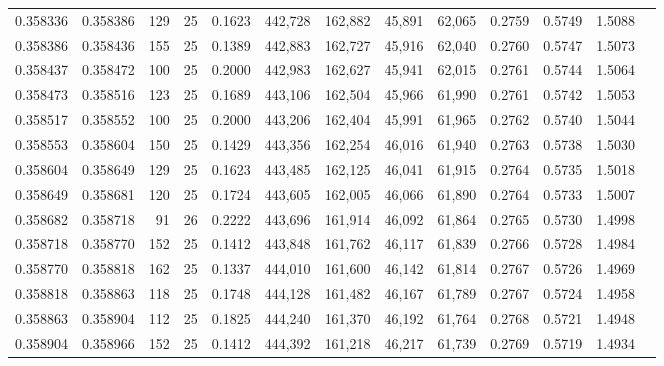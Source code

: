 \begin{tabular}{rrrrrrrrrrrrr}
0.358336 & 0.358386 &   129 &  25 &                                     0.1623 & 442,728 & 162,882 &  45,891 &  62,065 & 0.2759 & 0.5749 & 1.5088 \\
0.358386 & 0.358436 &   155 &  25 &                                     0.1389 & 442,883 & 162,727 &  45,916 &  62,040 & 0.2760 & 0.5747 & 1.5073 \\
0.358437 & 0.358472 &   100 &  25 &                                     0.2000 & 442,983 & 162,627 &  45,941 &  62,015 & 0.2761 & 0.5744 & 1.5064 \\
0.358473 & 0.358516 &   123 &  25 &                                     0.1689 & 443,106 & 162,504 &  45,966 &  61,990 & 0.2761 & 0.5742 & 1.5053 \\
0.358517 & 0.358552 &   100 &  25 &                                     0.2000 & 443,206 & 162,404 &  45,991 &  61,965 & 0.2762 & 0.5740 & 1.5044 \\
0.358553 & 0.358604 &   150 &  25 &                                     0.1429 & 443,356 & 162,254 &  46,016 &  61,940 & 0.2763 & 0.5738 & 1.5030 \\
0.358604 & 0.358649 &   129 &  25 &                                     0.1623 & 443,485 & 162,125 &  46,041 &  61,915 & 0.2764 & 0.5735 & 1.5018 \\
0.358649 & 0.358681 &   120 &  25 &                                     0.1724 & 443,605 & 162,005 &  46,066 &  61,890 & 0.2764 & 0.5733 & 1.5007 \\
0.358682 & 0.358718 &    91 &  26 &                                     0.2222 & 443,696 & 161,914 &  46,092 &  61,864 & 0.2765 & 0.5730 & 1.4998 \\
0.358718 & 0.358770 &   152 &  25 &                                     0.1412 & 443,848 & 161,762 &  46,117 &  61,839 & 0.2766 & 0.5728 & 1.4984 \\
0.358770 & 0.358818 &   162 &  25 &                                     0.1337 & 444,010 & 161,600 &  46,142 &  61,814 & 0.2767 & 0.5726 & 1.4969 \\
0.358818 & 0.358863 &   118 &  25 &                                     0.1748 & 444,128 & 161,482 &  46,167 &  61,789 & 0.2767 & 0.5724 & 1.4958 \\
0.358863 & 0.358904 &   112 &  25 &                                     0.1825 & 444,240 & 161,370 &  46,192 &  61,764 & 0.2768 & 0.5721 & 1.4948 \\
0.358904 & 0.358966 &   152 &  25 &                                     0.1412 & 444,392 & 161,218 &  46,217 &  61,739 & 0.2769 & 0.5719 & 1.4934 \\

\end{tabular}
